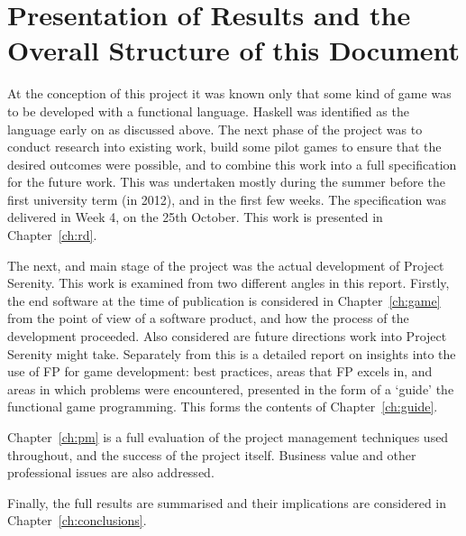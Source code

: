 \section{Presentation of Results and the Overall Structure of this Document}

At the conception of this project it was known only that some kind of game was to be developed with a functional language. Haskell was identified as the language early on as discussed above. The next phase of the project was to conduct research into existing work, build some pilot games to ensure that the desired outcomes were possible, and to combine this work into a full specification for the future work. This was undertaken mostly during the summer before the first university term (in 2012), and in the first few weeks. The specification was delivered in Week 4, on the 25th October. This work is presented in Chapter~\ref{ch:rd}.

The next, and main stage of the project was the actual development of Project Serenity. This work is examined from two different angles in this report. Firstly, the end software at the time of publication is considered in Chapter~\ref{ch:game} from the point of view of a software product, and how the process of the development proceeded. Also considered are future directions work into Project Serenity might take. Separately from this is a detailed report on insights into the use of FP for game development: best practices, areas that FP excels in, and areas in which problems were encountered, presented in the form of a `guide' the functional game programming. This forms the contents of Chapter~\ref{ch:guide}.

Chapter~\ref{ch:pm} is a full evaluation of the project management techniques used throughout, and the success of the project itself. Business value and other professional issues are also addressed.

Finally, the full results are summarised and their implications are considered in Chapter~\ref{ch:conclusions}.
